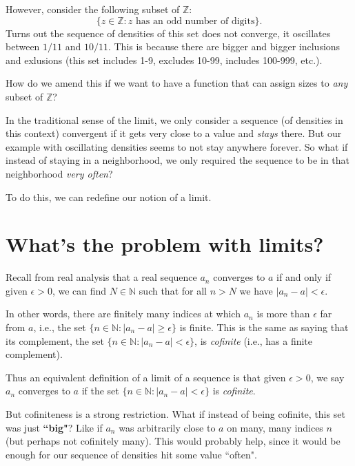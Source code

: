 \documentclass[12pt,reqno]{amsart}
\theoremstyle{plain} %
\theoremstyle{remark}
\theoremstyle{definition}
\newcommand{\Z}{\mathbb Z}
\newcommand{\N}{\mathbb N}
\newcommand{\e}{\epsilon}
\begin{document}
However, consider the following subset of $\Z$: 
\[
\{z \in \Z : z \text{ has an odd number of digits}\} .
\]
Turns out the sequence of densities of this set does not converge, it oscillates between $1/11$ and $10/11$. This is because there are bigger and bigger inclusions and exlusions (this set includes 1-9, excludes 10-99, includes 100-999, etc.). 

How do we amend this if we want to have a function that can assign sizes to \textit{any} subset of $\Z$? 

In the traditional sense of the limit, we only consider a sequence (of densities in this context) convergent if it gets very close to a value and \textit{stays} there. But our example with oscillating densities seems to not stay anywhere forever. So what if instead of staying in a neighborhood, we only required the sequence to be in that neighborhood \textit{very often}? 

To do this, we can redefine our notion of a limit.

\section{What's the problem with limits?}
Recall from real analysis that a real sequence $a_n$ converges to $a$ if and only if given $\e>0$, we can find $ N \in \N $ such that for all $n>N$ we have $|a_n-a|< \e$. 

In other words, there are finitely many indices at which $a_n$ is more than $\e$ far from $a$, i.e., the set $\{n \in \N : |a_n-a|\geq \e \}$ is finite.
This is the same as saying that its complement, the set $\{n \in \N : |a_n-a|< \e \}$, is \textit{cofinite} (i.e., has a finite complement). 

Thus an equivalent definition of a limit of a sequence is that given $\e >0$, we say $a_n$ converges to $a$ if the set $\{n \in \N : |a_n-a|< \e \}$ is \textit{cofinite}.

But cofiniteness is a strong restriction. What if instead of being cofinite, this set was just \textbf{``big"}? Like if $a_n$ was arbitrarily close to $a$ on many, many indices $n$ (but perhaps not cofinitely many). This would probably help, since it would be enough for our sequence of densities hit some value ``often". 
\end{document}
